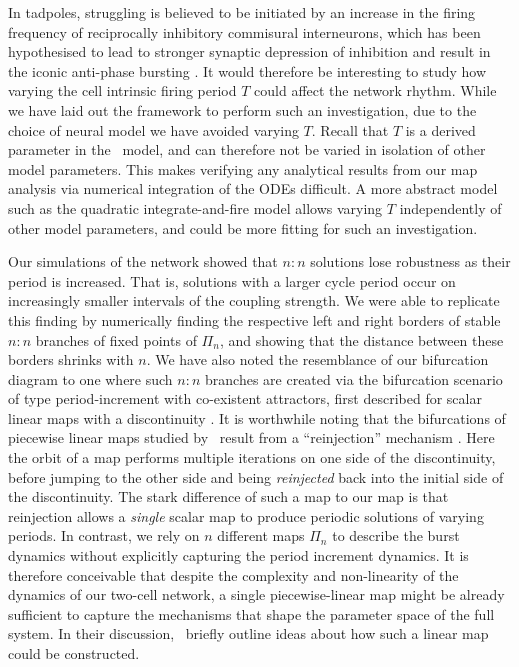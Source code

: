 \documentclass[utf8]{frontiersFPHY} %
\begin{document}
In tadpoles, struggling is believed to be initiated by an increase in the firing frequency of reciprocally inhibitory commisural interneurons, which has been hypothesised to lead to stronger synaptic depression of inhibition and result in the iconic anti-phase bursting \citep{li2007}.
It would therefore be interesting to study how varying the cell intrinsic firing period $T$ could affect the network rhythm.
While we have laid out the framework to perform such an investigation, due to the choice of neural model we have avoided varying $T$.
Recall that $T$ is a derived parameter in the~\citet{morris1981} model, and can therefore not be varied in isolation of other model parameters.
This makes verifying any analytical results from our map analysis via numerical integration of the ODEs difficult.
A more abstract model such as the quadratic integrate-and-fire model \citep{izhikevich2004} allows varying $T$ independently of other model parameters, and could be more fitting for such an investigation.

Our simulations of the network showed that $n:n$ solutions lose robustness as their period is increased.
That is, solutions with a larger cycle period occur on increasingly smaller intervals of the coupling strength.
We were able to replicate this finding by numerically finding the respective left and right borders of stable $n:n$ branches of fixed points of $\Pi_n$, and showing that the distance between these borders shrinks with $n$.
We have also noted the resemblance of our bifurcation diagram to one where such $n:n$ branches are created via the bifurcation scenario of type period-increment with co-existent attractors, first described for scalar linear maps with a discontinuity \citep{avrutin2012,avrutin2011}.
It is worthwhile noting that the bifurcations of piecewise linear maps studied by~\citeauthor{avrutin2012} result from a ``reinjection'' mechanism \cite{perez1985}.
Here the orbit of a map performs multiple iterations on one side of the discontinuity, before jumping to the other side and being \textit{reinjected} back into the initial side of the discontinuity.
The stark difference of such a map to our map is that reinjection allows a \emph{single} scalar map to produce periodic solutions of varying periods.
In contrast, we rely on $n$ different maps $\Pi_n$ to describe the burst dynamics without explicitly capturing the period increment dynamics.
It is therefore conceivable that despite the complexity and non-linearity of the dynamics of our two-cell network, a single piecewise-linear map might be already sufficient to capture the mechanisms that shape the parameter space of the full system.
In their discussion,~\citet{bose2011} briefly outline ideas about how such a linear map could be constructed.
\end{document}
